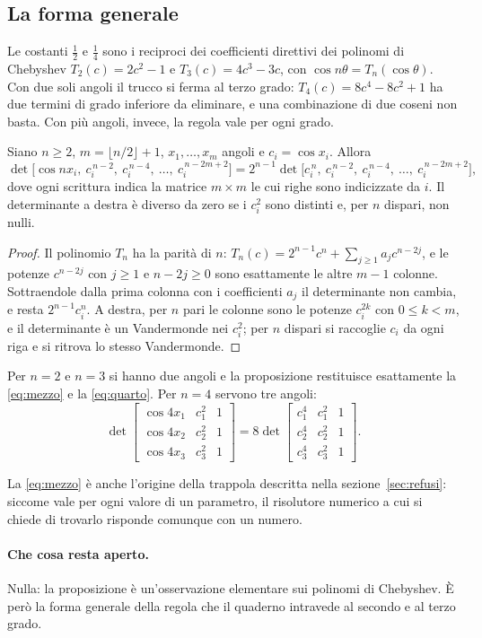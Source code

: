 \subsection{La forma generale}

Le costanti $\tfrac12$ e $\tfrac14$ sono i reciproci dei coefficienti
direttivi dei polinomi di Chebyshev $T_2(c)=2c^2-1$ e $T_3(c)=4c^3-3c$, con
$\cos n\theta=T_n(\cos\theta)$. Con due soli angoli il trucco si ferma al terzo
grado: $T_4(c)=8c^4-8c^2+1$ ha due termini di grado inferiore da eliminare, e
una combinazione di due coseni non basta. Con pi\`u angoli, invece, la regola
vale per ogni grado.

\begin{prop}\label{prop:chebyshev}
Siano $n\ge2$, $m=\lfloor n/2\rfloor+1$, $x_1,\dots,x_m$ angoli e
$c_i=\cos x_i$. Allora
\[
  \det\bigl[\cos nx_i,\ c_i^{\,n-2},\ c_i^{\,n-4},\ \dots,\ c_i^{\,n-2m+2}\bigr]
  =2^{n-1}\det\bigl[c_i^{\,n},\ c_i^{\,n-2},\ c_i^{\,n-4},\ \dots,\ c_i^{\,n-2m+2}\bigr],
\]
dove ogni scrittura indica la matrice $m\times m$ le cui righe sono indicizzate
da $i$. Il determinante a destra \`e diverso da zero se i $c_i^2$ sono distinti
e, per $n$ dispari, non nulli.
\end{prop}

\begin{proof}
Il polinomio $T_n$ ha la parit\`a di $n$: $T_n(c)=2^{n-1}c^n+\sum_{j\ge1}a_jc^{n-2j}$,
e le potenze $c^{n-2j}$ con $j\ge1$ e $n-2j\ge0$ sono esattamente le altre
$m-1$ colonne. Sottraendole dalla prima colonna con i coefficienti $a_j$ il
determinante non cambia, e resta $2^{n-1}c_i^n$. A destra, per $n$ pari le
colonne sono le potenze $c_i^{2k}$ con $0\le k<m$, e il determinante \`e un
Vandermonde nei $c_i^2$; per $n$ dispari si raccoglie $c_i$ da ogni riga e si
ritrova lo stesso Vandermonde.
\end{proof}

Per $n=2$ e $n=3$ si hanno due angoli e la proposizione restituisce
esattamente la \eqref{eq:mezzo} e la \eqref{eq:quarto}. Per $n=4$ servono tre
angoli:
\[
  \det\begin{bmatrix}
    \cos4x_1 & c_1^2 & 1\\
    \cos4x_2 & c_2^2 & 1\\
    \cos4x_3 & c_3^2 & 1
  \end{bmatrix}
  =8\det\begin{bmatrix}
    c_1^4 & c_1^2 & 1\\
    c_2^4 & c_2^2 & 1\\
    c_3^4 & c_3^2 & 1
  \end{bmatrix}.
\]

La \eqref{eq:mezzo} \`e anche l'origine della trappola descritta nella
sezione~\ref{sec:refusi}: siccome vale per ogni valore di un parametro, il
risolutore numerico a cui si chiede di trovarlo risponde comunque con un
numero.

\paragraph{Che cosa resta aperto.}
Nulla: la proposizione \`e un'osservazione elementare sui polinomi di
Chebyshev. \`E per\`o la forma generale della regola che il quaderno intravede
al secondo e al terzo grado.
